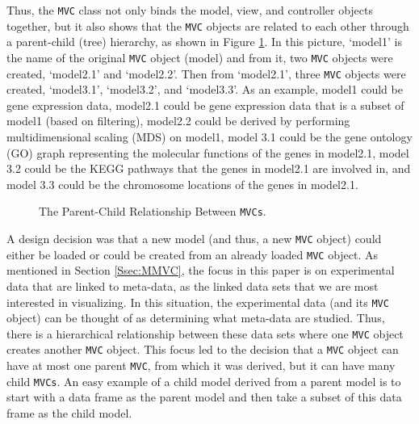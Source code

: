 \documentclass{article}[11pt]
\newcommand{\Robject}[1]{{\texttt{#1}}}
\newcommand{\Rclass}[1]{\texttt{#1}}
\begin{document}
Thus, the \Rclass{MVC} class not only binds the model,
view, and controller objects together, but it also shows
that the \Robject{MVC} objects are related to each other through a
parent-child (tree) hierarchy, as shown in Figure \ref{Fig:Hier}.  In this
picture, `model1' is the name of the original \Robject{MVC} object (model) and
from it, two \Robject{MVC} objects were created, `model2.1' and
`model2.2'. Then from `model2.1', three \Robject{MVC} objects were created,
`model3.1', `model3.2', and `model3.3'.  As an example, model1 could be gene
expression data, model2.1 could be gene expression data that is a subset of
model1 (based on filtering), model2.2 could be derived by performing
multidimensional scaling (MDS) on model1, model 3.1 could be the gene ontology
(GO) graph representing the molecular functions of the genes in model2.1,
model 3.2 could be the KEGG pathways that the genes in model2.1 are involved
in, and model 3.3 could be the chromosome locations of the genes in model2.1.


\begin{figure}[ht]
  \begin{center}
    \caption{ The Parent-Child Relationship Between \Robject{MVCs}. }
    \label{Fig:Hier}
  \end{center}
\end{figure}

A design decision was that a new model (and thus, a new
\Robject{MVC} object) could either be loaded or could be created from an
already loaded \Robject{MVC} object.  As mentioned in Section \ref{Ssec:MMVC},
the focus in this paper is on experimental data that are linked to meta-data,
as the linked data sets that we are most interested in visualizing.  In this
situation, the experimental data (and its \Robject{MVC} object) can be thought
of as determining what meta-data are studied.  Thus, there is a hierarchical
relationship between these data sets where one \Robject{MVC} object creates
another \Robject{MVC} object.  This focus led to the decision that a
\Robject{MVC} object can have at most one parent \Robject{MVC}, from which it
was derived, but it can have many child \Robject{MVCs}.  An easy example of a
child model derived from a parent model is to start with a
data frame as the parent model and then take a subset of this data
frame as the child model. 
\end{document}
